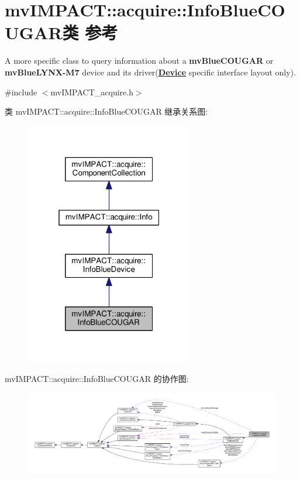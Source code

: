 \hypertarget{classmv_i_m_p_a_c_t_1_1acquire_1_1_info_blue_c_o_u_g_a_r}{\section{mv\+I\+M\+P\+A\+C\+T\+:\+:acquire\+:\+:Info\+Blue\+C\+O\+U\+G\+A\+R类 参考}
\label{classmv_i_m_p_a_c_t_1_1acquire_1_1_info_blue_c_o_u_g_a_r}
}


A more specific class to query information about a {\bfseries mv\+Blue\+C\+O\+U\+G\+A\+R} or {\bfseries mv\+Blue\+L\+Y\+N\+X-\/\+M7} device and its driver({\bfseries \hyperlink{classmv_i_m_p_a_c_t_1_1acquire_1_1_device}{Device}} specific interface layout only).  




{\ttfamily \#include $<$mv\+I\+M\+P\+A\+C\+T\+\_\+acquire.\+h$>$}



类 mv\+I\+M\+P\+A\+C\+T\+:\+:acquire\+:\+:Info\+Blue\+C\+O\+U\+G\+A\+R 继承关系图\+:
\nopagebreak
\begin{figure}[H]
\begin{center}
\leavevmode
\includegraphics[width=208pt]{classmv_i_m_p_a_c_t_1_1acquire_1_1_info_blue_c_o_u_g_a_r__inherit__graph}
\end{center}
\end{figure}


mv\+I\+M\+P\+A\+C\+T\+:\+:acquire\+:\+:Info\+Blue\+C\+O\+U\+G\+A\+R 的协作图\+:
\nopagebreak
\begin{figure}[H]
\begin{center}
\leavevmode
\includegraphics[width=350pt]{classmv_i_m_p_a_c_t_1_1acquire_1_1_info_blue_c_o_u_g_a_r__coll__graph}
\end{center}
\end{figure}
